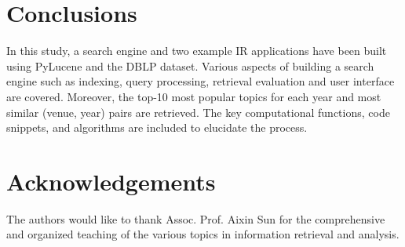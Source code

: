 \documentclass{sig-alternate-05-2015}
\begin{document}
\section{Conclusions} \label{sec:conc}
In this study, a search engine and two example IR applications have been built using PyLucene and the DBLP dataset. Various aspects of building a search engine such as indexing, query processing, retrieval evaluation and user interface are covered. Moreover, the top-10 most popular topics for each year and most similar (venue, year) pairs are retrieved. The key computational functions, code snippets, and algorithms are included to elucidate the process. 

\section{Acknowledgements}
The authors would like to thank Assoc. Prof. Aixin Sun for the comprehensive and organized teaching of the various topics in information retrieval and analysis.
%

%
\end{document}
